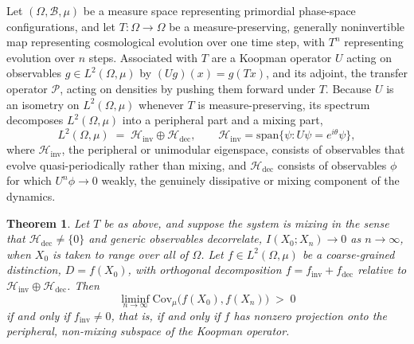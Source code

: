 \documentclass[11pt]{article}
\newtheorem{theorem}{Theorem}
\begin{document}
Let $(\Omega, \mathcal B, \mu)$ be a measure space representing primordial phase-space configurations, and let $T : \Omega \to \Omega$ be a measure-preserving, generally noninvertible map representing cosmological evolution over one time step, with $T^n$ representing evolution over $n$ steps. Associated with $T$ are a Koopman operator $U$ acting on observables $g \in L^2(\Omega, \mu)$ by $(Ug)(x) = g(Tx)$, and its adjoint, the transfer operator $\mathcal P$, acting on densities by pushing them forward under $T$. Because $U$ is an isometry on $L^2(\Omega, \mu)$ whenever $T$ is measure-preserving, its spectrum decomposes $L^2(\Omega, \mu)$ into a peripheral part and a mixing part,
\begin{equation}
L^2(\Omega, \mu) \;=\; \mathcal H_{\mathrm{inv}} \oplus \mathcal H_{\mathrm{dec}}, \qquad \mathcal H_{\mathrm{inv}} = \mathrm{span}\{\psi : U\psi = e^{i\theta}\psi\},
\end{equation}
where $\mathcal H_{\mathrm{inv}}$, the peripheral or unimodular eigenspace, consists of observables that evolve quasi-periodically rather than mixing, and $\mathcal H_{\mathrm{dec}}$ consists of observables $\phi$ for which $U^n\phi \to 0$ weakly, the genuinely dissipative or mixing component of the dynamics.

\begin{theorem}
Let $T$ be as above, and suppose the system is mixing in the sense that $\mathcal H_{\mathrm{dec}} \neq \{0\}$ and generic observables decorrelate, $I(X_0; X_n) \to 0$ as $n \to \infty$, when $X_0$ is taken to range over all of $\Omega$. Let $f \in L^2(\Omega, \mu)$ be a coarse-grained distinction, $D = f(X_0)$, with orthogonal decomposition $f = f_{\mathrm{inv}} + f_{\mathrm{dec}}$ relative to $\mathcal H_{\mathrm{inv}} \oplus \mathcal H_{\mathrm{dec}}$. Then
\begin{equation}
\liminf_{n \to \infty} \mathrm{Cov}_\mu\big(f(X_0), f(X_n)\big) \;>\; 0
\end{equation}
if and only if $f_{\mathrm{inv}} \neq 0$, that is, if and only if $f$ has nonzero projection onto the peripheral, non-mixing subspace of the Koopman operator.
\end{theorem}
\end{document}
